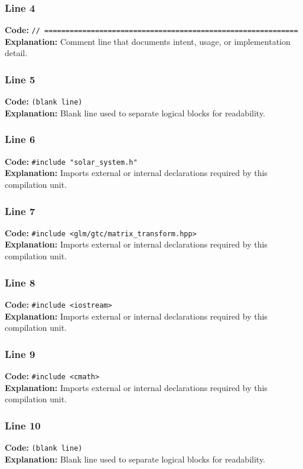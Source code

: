 \documentclass[11pt,a4paper]{article}
\begin{document}
\subsubsection*{Line 4}
\textbf{Code:} \verb|// ============================================================|\\
\textbf{Explanation:} Comment line that documents intent, usage, or implementation detail.

\subsubsection*{Line 5}
\textbf{Code:} \texttt{(blank line)}\\
\textbf{Explanation:} Blank line used to separate logical blocks for readability.

\subsubsection*{Line 6}
\textbf{Code:} \verb|#include "solar_system.h"|\\
\textbf{Explanation:} Imports external or internal declarations required by this compilation unit.

\subsubsection*{Line 7}
\textbf{Code:} \verb|#include <glm/gtc/matrix_transform.hpp>|\\
\textbf{Explanation:} Imports external or internal declarations required by this compilation unit.

\subsubsection*{Line 8}
\textbf{Code:} \verb|#include <iostream>|\\
\textbf{Explanation:} Imports external or internal declarations required by this compilation unit.

\subsubsection*{Line 9}
\textbf{Code:} \verb|#include <cmath>|\\
\textbf{Explanation:} Imports external or internal declarations required by this compilation unit.

\subsubsection*{Line 10}
\textbf{Code:} \texttt{(blank line)}\\
\textbf{Explanation:} Blank line used to separate logical blocks for readability.
\end{document}
